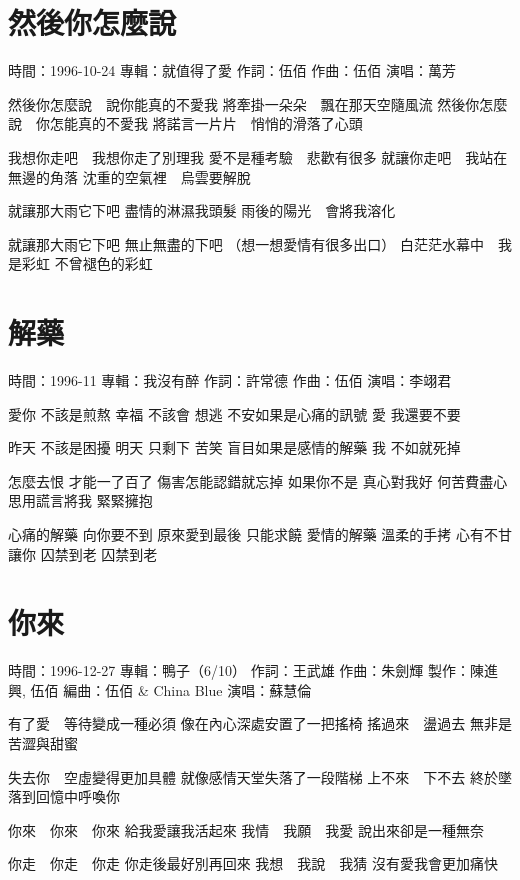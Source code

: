 \documentclass[UTF8,a4paper,oneside,twocolumn,12pt]{ctexbook}
\newcommand{\infopair}[2]{\textbullet #1：#2}
\newcommand{\zc}[1][伍佰]{\infopair{作詞}{#1}}
\newcommand{\zq}[1][伍佰]{\infopair{作曲}{#1}}
\newcommand{\bq}[1][伍佰]{\infopair{編曲}{#1}}
\newcommand{\zj}[1]{\infopair{專輯}{#1}}
\newcommand{\zz}[1]{\infopair{製作}{#1}}
\newcommand{\sj}[1]{\infopair{時間}{#1}}
\newenvironment{info}{\begin{flushleft}\kaishu
	}
	{\end{flushleft}\normalsize\yahei\par}
\newenvironment{lyric}{
	}
{}
\begin{document}
\section{然後你怎麼說}
\begin{info}
	\sj{1996-10-24}
	\zj{就值得了愛}
	\zc
	\zq
	\infopair{演唱}{萬芳}
\end{info}
\begin{lyric}
	然後你怎麼說　說你能真的不愛我
	將牽掛一朵朵　飄在那天空隨風流
	然後你怎麼說　你怎能真的不愛我
	將諾言一片片　悄悄的滑落了心頭

	我想你走吧　我想你走了別理我
	愛不是種考驗　悲歡有很多
	就讓你走吧　我站在無邊的角落
	沈重的空氣裡　烏雲要解脫

	就讓那大雨它下吧
	盡情的淋濕我頭髮
	雨後的陽光　會將我溶化

	就讓那大雨它下吧
	無止無盡的下吧
	（想一想愛情有很多出口）
	白茫茫水幕中　我是彩虹
	不曾褪色的彩虹
\end{lyric}

\section{解藥}
\begin{info}
	\sj{1996-11}
	\zj{我沒有醉}
	\zc[許常德]
	\zq
	\infopair{演唱}{李翊君}
\end{info}
\begin{lyric}
	愛你 不該是煎熬 幸福 不該會 想逃
	不安如果是心痛的訊號 愛 我還要不要

	昨天 不該是困擾 明天 只剩下 苦笑
	盲目如果是感情的解藥 我 不如就死掉

	怎麼去恨 才能一了百了 傷害怎能認錯就忘掉
	如果你不是 真心對我好 何苦費盡心思用謊言將我 緊緊擁抱

	心痛的解藥 向你要不到 原來愛到最後 只能求饒
	愛情的解藥 溫柔的手拷 心有不甘讓你 囚禁到老 囚禁到老
\end{lyric}

\section{你來}
\begin{info}
	\sj{1996-12-27}
	\zj{鴨子（6/10）}
	\zc[王武雄]
	\zq[朱劍輝]
	\zz{陳進興, 伍佰}
	\bq[伍佰 \& China Blue]
	\infopair{演唱}{蘇慧倫}
\end{info}
\begin{lyric}
	有了愛　等待變成一種必須
	像在內心深處安置了一把搖椅
	搖過來　盪過去
	無非是苦澀與甜蜜

	失去你　空虛變得更加具體
	就像感情天堂失落了一段階梯
	上不來　下不去
	終於墜落到回憶中呼喚你

	你來　你來　你來
	給我愛讓我活起來
	我情　我願　我愛
	說出來卻是一種無奈

	你走　你走　你走
	你走後最好別再回來
	我想　我說　我猜
	沒有愛我會更加痛快
\end{lyric}
\end{document}
